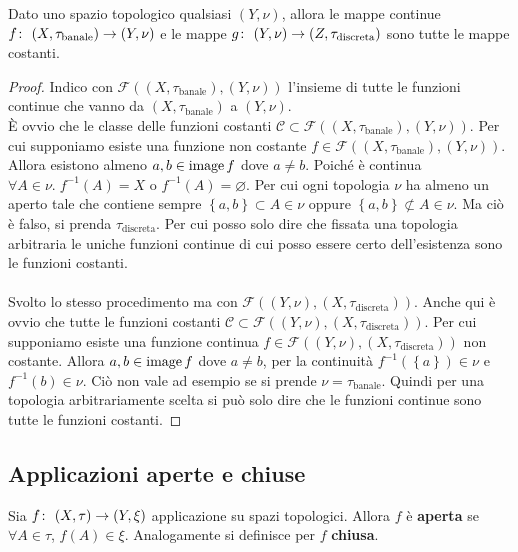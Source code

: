 \begin{theorem}
	Dato uno spazio topologico qualsiasi $(Y,\nu)$, allora le mappe continue $f \colon\ (X,\tau_{\text{banale}}) \rightarrow (Y,\nu)$ e le mappe $g \colon\ (Y,\nu) \rightarrow (Z,\tau_{\text{discreta}})$ sono tutte le mappe costanti.
\end{theorem}
\begin{proof}
	Indico con $\mathcal{F}((X,\tau_{\text{banale}}),(Y,\nu))$ l'insieme di tutte le funzioni continue che vanno da $(X,\tau_{\text{banale}})$ a $(Y,\nu)$. \\ È ovvio che le classe delle funzioni costanti $\mathcal{C} \subset \mathcal{F}((X,\tau_{\text{banale}}),(Y,\nu))$. Per cui supponiamo esiste una funzione non costante $f \in \mathcal{F}((X,\tau_{\text{banale}}),(Y,\nu))$. Allora esistono almeno $a,b \in \operatorname{image}{f}$ dove $a \neq b$. Poiché è continua $\forall A \in \nu . \; f^{-1}(A) = X$ o $f^{-1}(A) = \varnothing$. Per cui ogni topologia $\nu$ ha almeno un aperto tale che contiene sempre $\left\{a,b\right\} \subset A \in \nu$ oppure $\left\{a,b\right\} \not\subset A \in \nu$. Ma ciò è falso, si prenda $\tau_{\text{discreta}}$. Per cui posso solo dire che fissata una topologia arbitraria le uniche funzioni continue di cui posso essere certo dell'esistenza sono le funzioni costanti. \\ \\
	
	Svolto lo stesso procedimento ma con $\mathcal{F}((Y,\nu), (X,\tau_{\text{discreta}}))$. Anche qui è ovvio che tutte le funzioni costanti $\mathcal{C} \subset \mathcal{F}((Y,\nu), (X,\tau_{\text{discreta}}))$. Per cui supponiamo esiste una funzione continua $f \in \mathcal{F}((Y,\nu), (X,\tau_{\text{discreta}}))$ non costante. Allora $a,b \in \operatorname{image}{f}$ dove $a \neq b$, per la continuità $f^{-1}(\left\{a\right\}) \in \nu $ e $f^{-1}(b) \in \nu$. Ciò non vale ad esempio se si prende $\nu = \tau_{\text{banale}}$. Quindi per una topologia arbitrariamente scelta si può solo dire che le funzioni continue sono tutte le funzioni costanti.
\end{proof}



\subsection{\textcolor{TopGener}{\textbf{Applicazioni aperte e chiuse}}}



\begin{definition}
	Sia $f \colon\ (X,\tau) \rightarrow (Y,\xi)$ applicazione su spazi topologici. Allora $f$ è \textbf{aperta} se $\forall A \in \tau$, $f(A) \in \xi$. Analogamente si definisce per $f$ \textbf{chiusa}.
\end{definition}

